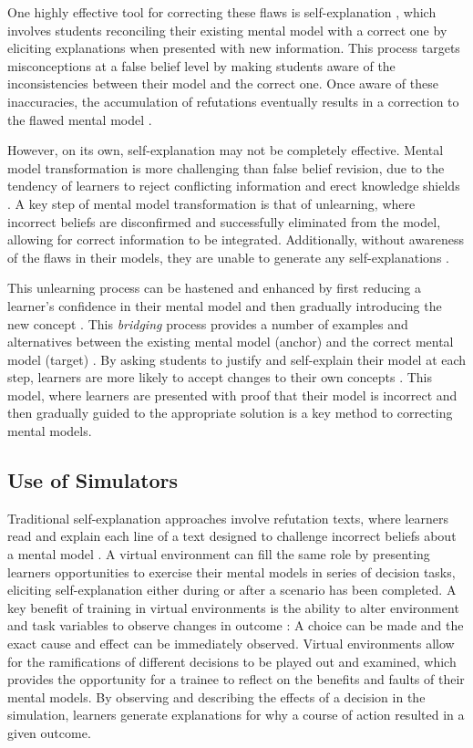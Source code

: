 One highly effective tool for correcting these flaws is self-explanation \citep{Chi1994}, which involves students reconciling their existing mental model with a correct one by eliciting explanations when presented with new information. This process targets misconceptions at a false belief level by making students aware of the inconsistencies between their model and the correct one. Once aware of these inaccuracies, the accumulation of refutations eventually results in a correction to the flawed mental model \citep{Chi2008}.

However, on its own, self-explanation may not be completely effective. Mental model transformation is more challenging than false belief revision, due to the tendency of learners to reject conflicting information and erect knowledge shields \citep{Klein2006}. A key step of mental model transformation is that of unlearning, where incorrect beliefs are disconfirmed and successfully eliminated from the model, allowing for correct information to be integrated. Additionally, without awareness of the flaws in their models, they are unable to generate any self-explanations \citep{Chi2008}.

This unlearning process can be hastened and enhanced by first reducing a learner's confidence in their mental model and then gradually introducing the new concept \citep{Klein2006}. This \emph{bridging} process provides a number of examples and alternatives between the existing mental model (anchor) and the correct mental model (target) \citep{Brown1989}. By asking students to justify and self-explain their model at each step, learners are more likely to accept changes to their own concepts \citep{Brown1989, Chi2008, Chi1994}. This model, where learners are presented with proof that their model is incorrect and then gradually guided to the appropriate solution is a key method to correcting mental models.

\subsection{Use of Simulators}

Traditional self-explanation approaches involve refutation texts, where learners read and explain each line of a text designed to challenge incorrect beliefs about a mental model \citep{Chi1994}. A virtual environment can fill the same role by presenting learners opportunities to exercise their mental models in series of decision tasks, eliciting self-explanation either during or after a scenario has been completed. A key benefit of training in virtual environments is the ability to alter environment and task variables to observe changes in outcome \citep{Klein2006}: A choice can be made and the exact cause and effect can be immediately observed. Virtual environments allow for the ramifications of different decisions to be played out and examined, which provides the opportunity for a trainee to reflect on the benefits and faults of their mental models. By observing and describing the effects of a decision in the simulation, learners generate explanations for why a course of action resulted in a given outcome.

